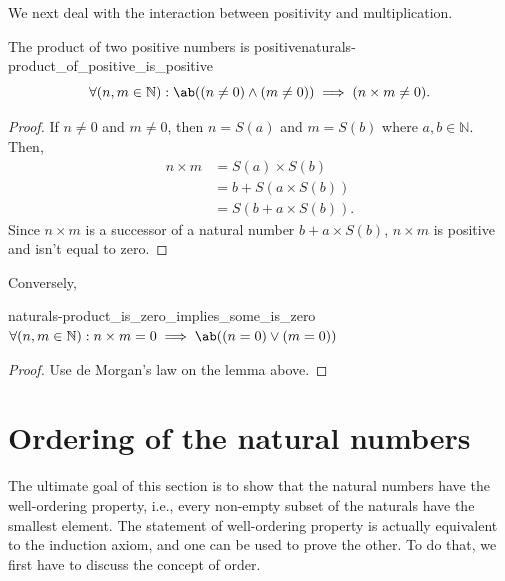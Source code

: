 We next deal with the interaction between positivity and multiplication.
\begin{lemma}{The product of two positive numbers is positive}{naturals-product_of_positive_is_positive}
  \begin{equation*}
    \forall (n, m \in \mathbb{N}) : \ab((n \neq 0) \land (m \neq 0)) \implies (n \times m \neq 0).
  \end{equation*}
\end{lemma}
\begin{proof}
  If \(n \neq 0\) and \(m \neq 0\), then \(n = S(a)\) and \(m = S(b)\) where
  \(a, b \in \mathbb{N}\). Then,
  \begin{align}
    n \times m & = S(a) \times S(b)      \\
               & = b + S(a \times S(b))  \\
               & = S(b + a \times S(b)).
  \end{align}
  Since \(n \times m\) is a successor of a natural number \(b + a \times S(b)\),
  \(n \times m\) is positive and isn't equal to zero.
\end{proof}
Conversely,
\begin{cor}{}{naturals-product_is_zero_implies_some_is_zero}
  \(\forall (n, m \in \mathbb{N}) : n \times m = 0 \implies \ab((n = 0) \lor (m = 0))\)
\end{cor}
\begin{proof}
  Use de Morgan's law on the lemma above.
\end{proof}

\section{Ordering of the natural numbers}
\label{sec:naturals_order}

The ultimate goal of this section is to show that the natural numbers have the well-ordering
property, i.e., every non-empty subset of the naturals have the smallest element. The statement of
well-ordering property is actually equivalent to the induction axiom, and one can be used to prove
the other. To do that, we first have to discuss the concept of order.

